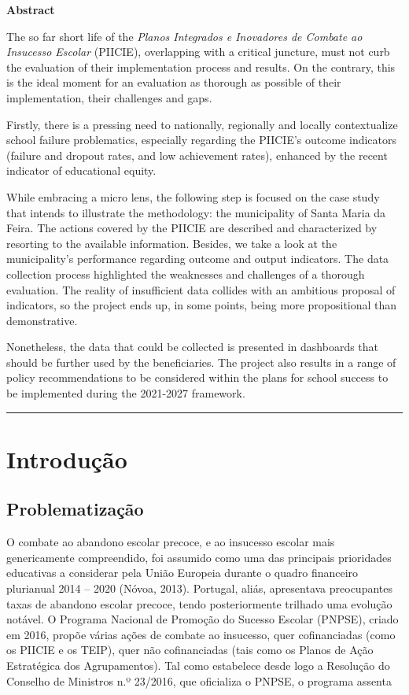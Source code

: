 \documentclass[
]{book}
\begin{document}
\textbf{Abstract}

The so far short life of the \emph{Planos Integrados e Inovadores de Combate ao Insucesso Escolar} (PIICIE), overlapping with a critical juncture, must not curb the evaluation of their implementation process and results. On the contrary, this is the ideal moment for an evaluation as thorough as possible of their implementation, their challenges and gaps.

Firstly, there is a pressing need to nationally, regionally and locally contextualize school failure problematics, especially regarding the PIICIE's outcome indicators (failure and dropout rates, and low achievement rates), enhanced by the recent indicator of educational equity.

While embracing a micro lens, the following step is focused on the case study that intends to illustrate the methodology: the municipality of Santa Maria da Feira. The actions covered by the PIICIE are described and characterized by resorting to the available information. Besides, we take a look at the municipality's performance regarding outcome and output indicators. The data collection process highlighted the weaknesses and challenges of a thorough evaluation. The reality of insufficient data collides with an ambitious proposal of indicators, so the project ends up, in some points, being more propositional than demonstrative.

Nonetheless, the data that could be collected is presented in dashboards that should be further used by the beneficiaries. The project also results in a range of policy recommendations to be considered within the plans for school success to be implemented during the 2021-2027 framework.

\begin{center}\rule{0.5\linewidth}{0.5pt}\end{center}

\hypertarget{introduuxe7uxe3o}{%
\chapter{Introdução}\label{introduuxe7uxe3o}}

\hypertarget{problematizauxe7uxe3o}{%
\section{Problematização}\label{problematizauxe7uxe3o}}

O combate ao abandono escolar precoce, e ao insucesso escolar mais genericamente compreendido, foi assumido como uma das principais prioridades educativas a considerar pela União Europeia durante o quadro financeiro plurianual 2014 -- 2020 (Nóvoa, 2013). Portugal, aliás, apresentava preocupantes taxas de abandono escolar precoce, tendo posteriormente trilhado uma evolução notável. O Programa Nacional de Promoção do Sucesso Escolar (PNPSE), criado em 2016, propõe várias ações de combate ao insucesso, quer cofinanciadas (como os PIICIE e os TEIP), quer não cofinanciadas (tais como os Planos de Ação Estratégica dos Agrupamentos). Tal como estabelece desde logo a Resolução do Conselho de Ministros n.º 23/2016, que oficializa o PNPSE, o programa assenta
\end{document}
